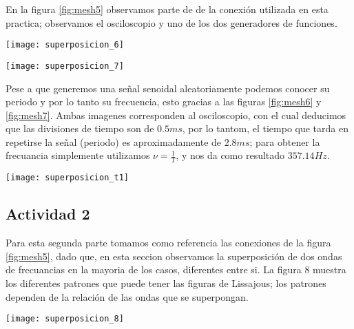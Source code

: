 \documentclass[11pt]{article}
\newenvironment{Figuras}
  {\par\medskip\noindent\minipage{\linewidth}}
  {\endminipage\par\medskip}
\begin{document}
\begin{multicols}{2}
En la figura  \ref{fig:mesh5} observamos parte de de la conexión utilizada en esta practica; observamos el osciloscopio y uno de los dos generadores de funciones.

\begin{Figuras}
	\centering
    \texttt{[image: superposicion\_6]}
    \label{fig:mesh6}
\end{Figuras}

\begin{Figuras}
	\centering
    \texttt{[image: superposicion\_7]}
    \label{fig:mesh7}
\end{Figuras}

Pese a que generemos una señal senoidal aleatoriamente podemos conocer su periodo y por lo tanto su frecuencia, esto gracias a  las figuras \ref{fig:mesh6} y \ref{fig:mesh7}. Ambas imagenes  corresponden al osciloscopio, con el cual deducimos que las divisiones de tiempo son de $0.5 ms$, por lo tantom, el tiempo que tarda en repetirse la señal (periodo) es aproximadamente de $2.8 ms$; para obtener la frecuancia simplemente utilizamos $\nu=\frac{1}{T}$, y nos da como resultado $357.14 Hz$.\\

\begin{Figuras}
	\centering
    \texttt{[image: superposicion\_t1]}
\end{Figuras}

		\subsection{Actividad 2}

Para esta segunda parte tomamos como referencia las conexiones de la figura \ref{fig:mesh5}, dado que, en esta seccion observamos la superposición de dos ondas de frecuancias en la mayoria de los casos, diferentes entre si. La figura 8 muestra los diferentes patrones que puede tener las figuras de Lissajous; los patrones dependen de la relación de las ondas que se superpongan.

\begin{Figuras}
	\centering
    \texttt{[image: superposicion\_8]}
    \label{fig:mesh8}
\end{Figuras}


\end{multicols}
\end{document}
